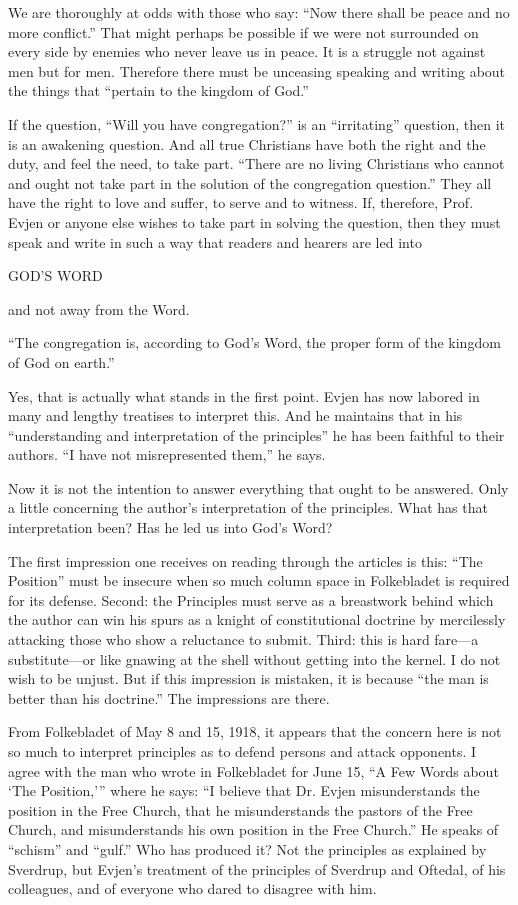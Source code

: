 We are thoroughly at odds with those who say: “Now there shall be peace and no more conflict.” That might perhaps be possible if we were not surrounded on every side by enemies who never leave us in peace. It is a struggle not against men but for men. Therefore there must be unceasing speaking and writing about the things that “pertain to the kingdom of God.”

If the question, “Will you have congregation?” is an “irritating” question, then it is an awakening question. And all true Christians have both the right and the duty, and feel the need, to take part. “There are no living Christians who cannot and ought not take part in the solution of the congregation question.” They all have the right to love and suffer, to serve and to witness. If, therefore, Prof. Evjen or anyone else wishes to take part in solving the question, then they must speak and write in such a way that readers and hearers are led into

GOD’S WORD

and not away from the Word.

“The congregation is, according to God’s Word, the proper form of the kingdom of God on earth.”

Yes, that is actually what stands in the first point. Evjen has now labored in many and lengthy treatises to interpret this. And he maintains that in his “understanding and interpretation of the principles” he has been faithful to their authors. “I have not misrepresented them,” he says.

Now it is not the intention to answer everything that ought to be answered. Only a little concerning the author’s interpretation of the principles. What has that interpretation been? Has he led us into God’s Word?

The first impression one receives on reading through the articles is this: “The Position” must be insecure when so much column space in Folkebladet is required for its defense. Second: the Principles must serve as a breastwork behind which the author can win his spurs as a knight of constitutional doctrine by mercilessly attacking those who show a reluctance to submit. Third: this is hard fare—a substitute—or like gnawing at the shell without getting into the kernel. I do not wish to be unjust. But if this impression is mistaken, it is because “the man is better than his doctrine.” The impressions are there.

From Folkebladet of May 8 and 15, 1918, it appears that the concern here is not so much to interpret principles as to defend persons and attack opponents. I agree with the man who wrote in Folkebladet for June 15, “A Few Words about ‘The Position,’” where he says: “I believe that Dr. Evjen misunderstands the position in the Free Church, that he misunderstands the pastors of the Free Church, and misunderstands his own position in the Free Church.” He speaks of “schism” and “gulf.” Who has produced it? Not the principles as explained by Sverdrup, but Evjen’s treatment of the principles of Sverdrup and Oftedal, of his colleagues, and of everyone who dared to disagree with him.

